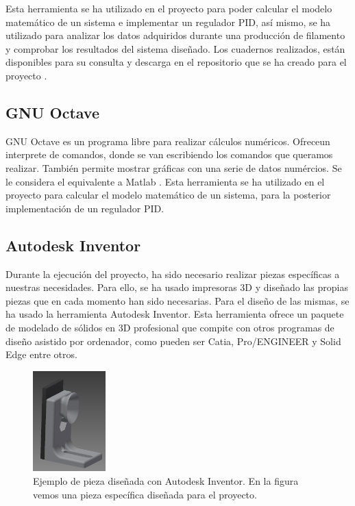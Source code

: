 Esta herramienta se ha utilizado en el proyecto para poder calcular el modelo matemático de un sistema e implementar un regulador PID, así mismo, se ha utilizado para analizar los datos adquiridos durante una producción de filamento y comprobar los resultados del sistema diseñado. Los cuadernos realizados, están disponibles para su consulta y descarga en el repositorio que se ha creado para el proyecto \cite{githubTFG}.

\subsection{GNU Octave}
GNU Octave es un programa libre para realizar cálculos numéricos. Ofreceun interprete de comandos, donde se van escribiendo los comandos que queramos realizar. También permite mostrar gráficas con una serie de datos numércios. Se le considera el equivalente a Matlab \cite{octave}. Esta herramienta se ha utilizado en el proyecto para calcular el modelo matemático de un sistema, para la posterior implementación de un regulador PID.

\subsection{Autodesk Inventor}
Durante la ejecución del proyecto, ha sido necesario realizar piezas específicas a nuestras necesidades. Para ello, se ha usado impresoras 3D y diseñado las propias piezas que en cada momento han sido necesarias. Para el diseño de las mismas, se ha usado la herramienta Autodesk Inventor. Esta herramienta ofrece un paquete de modelado de sólidos en 3D profesional que compite con otros programas de diseño asistido por ordenador, como pueden ser Catia, Pro/ENGINEER y Solid Edge entre otros.

\begin{figure}[H]
    \centering
    \includegraphics[width=0.25\textwidth]{images/peletizadora/guia.png}
    \caption[Ejemplo de pieza diseñada con Autodesk Inventor.]{Ejemplo de pieza diseñada con Autodesk Inventor. En la figura vemos una pieza específica diseñada para el proyecto.}
    \label{fig:pieza}
\end{figure}

